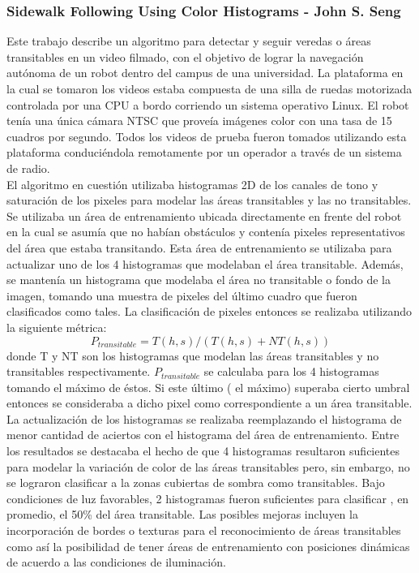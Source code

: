 	\subsubsection{\label{sec:sidewalk} Sidewalk Following Using Color Histograms - John S. Seng}
	Este trabajo describe un algoritmo  para detectar y seguir 
	veredas o áreas transitables en un video filmado, con el objetivo de 
	lograr la navegación autónoma de un robot dentro del 
	campus de una universidad. La plataforma en la cual se tomaron los 
	videos estaba 
	compuesta de una silla de ruedas motorizada controlada por una CPU 
	a bordo corriendo un sistema operativo Linux. El robot tenía una 
	única cámara NTSC que proveía imágenes color con una tasa de 15 
	cuadros por segundo. Todos los videos de prueba fueron tomados 
	utilizando esta plataforma conduciéndola remotamente por un 
	operador a través de un sistema de radio.\\
	\indent El algoritmo en cuestión utilizaba histogramas 2D de los 
	canales de tono y saturación de los pixeles para modelar las áreas
	transitables y las no transitables. Se utilizaba un área de 
	entrenamiento ubicada directamente en frente del robot en la cual se 
	asumía que 
	no habían obstáculos y contenía pixeles representativos del área que 
	estaba transitando. Esta área de entrenamiento se utilizaba para 
	actualizar uno de los 4 histogramas que modelaban el área 
	transitable. Además, se mantenía un histograma que modelaba el
	área no transitable o fondo de la imagen, tomando una muestra de pixeles del último 
	cuadro que fueron clasificados como tales. La 
	clasificación de pixeles entonces se realizaba utilizando la 
	siguiente métrica:
	\[
	P_{transitable}= T(h,s)/ ( T(h,s) + NT(h,s))
	\]
	donde T y NT son los histogramas que modelan las áreas transitables
	y no transitables respectivamente. $P_{transitable}$ se calculaba para 
	los 4 histogramas tomando el máximo de éstos. Si este último ( el 
	máximo) superaba 
	cierto umbral entonces se consideraba a dicho pixel como 
	correspondiente a un área transitable.
	La actualización de los histogramas se realizaba reemplazando el 
	histograma de menor cantidad de aciertos con el histograma 
	del área de entrenamiento.  Entre los resultados se destacaba el 
	hecho de que 4 histogramas resultaron suficientes para modelar la
	variación de color de las áreas transitables pero, sin embargo, no 
	se lograron clasificar a la zonas cubiertas de sombra como transitables.
	Bajo condiciones de luz favorables, 2 histogramas fueron 
	suficientes para clasificar , en promedio, el 50\% del área 
	transitable. Las posibles mejoras incluyen la incorporación de 
	bordes o texturas para el reconocimiento de áreas transitables 
	como así la posibilidad de tener áreas de entrenamiento con 
	posiciones dinámicas de acuerdo a las condiciones de iluminación.
	
